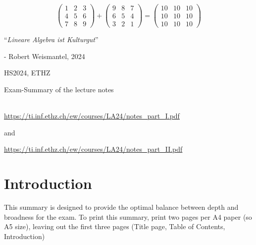\documentclass{article}
\begin{document}
\startDocument
\usetcolorboxes
\setcounter{section}{-1}
\setcounter{numberingConfig}{3}

\vspace{3cm}
\begin{Huge}
    \[
        \begin{pmatrix}
            1 & 2 & 3\\
            4 & 5 & 6\\
            7 & 8 & 9
        \end{pmatrix} + 
        \begin{pmatrix}
            9 & 8 & 7\\
            6 & 5 & 4\\
            3 & 2 & 1
        \end{pmatrix} =
        \begin{pmatrix}
            10 & 10 & 10\\
            10 & 10 & 10\\
            10 & 10 & 10
        \end{pmatrix}
    \]
\end{Huge}

\vspace{3cm}
\begin{center}
    \begin{Large}
        ``\textit{Lineare Algebra ist Kulturgut}''
    \end{Large}

    \hspace{3cm} - Robert Weismantel, 2024
\end{center}

\vspace{3cm}
\begin{center}
    HS2024, ETHZ\\[0.2cm]
    \begin{Large}
        Exam-Summary of the lecture notes
    \end{Large}\\[0.2cm]
    \url{https://ti.inf.ethz.ch/ew/courses/LA24/notes_part_I.pdf} 
    
    and 

    \url{https://ti.inf.ethz.ch/ew/courses/LA24/notes_part_II.pdf}
\end{center}
\newpage

\newpage
\newsection
\section{Introduction}
This summary is designed to provide the optimal balance between depth and broadness for the exam. To print this summary, print two pages per A4 paper (so A5 size), leaving out the first three pages (Title page, Table of Contents, Introduction)
\end{document}
